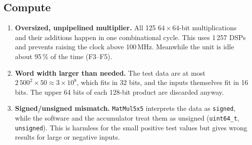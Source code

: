 \documentclass[11pt,a4paper]{article}
\newcommand{\code}[1]{\texttt{#1}}
\begin{document}
\subsection{Compute}
\begin{enumerate}[label=\textbf{F\arabic*},resume]
  \item \textbf{Oversized, unpipelined multiplier.} All 125 $64\times64$-bit multiplications and their additions happen in one combinational cycle. This uses 1\,257 DSPs and prevents raising the clock above 100\,MHz. Meanwhile the unit is idle about 95\,\% of the time (F3--F5).
  \item \textbf{Word width larger than needed.} The test data are at most $2\,500^2 \times 50 \approx 3\times10^8$, which fits in 32 bits, and the inputs themselves fit in 16 bits. The upper 64 bits of each 128-bit product are discarded anyway.
  \item \textbf{Signed/unsigned mismatch.} \code{MatMul5x5} interprets the data as \code{signed}, while the software and the accumulator treat them as unsigned (\code{uint64\_t}, \code{unsigned}). This is harmless for the small positive test values but gives wrong results for large or negative inputs.
\end{enumerate}
\end{document}
